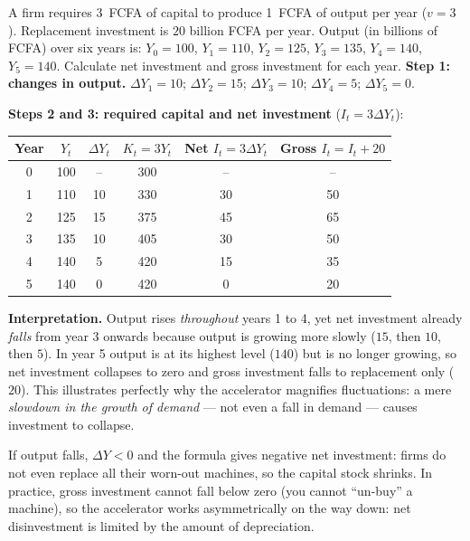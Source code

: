 \documentclass[11pt]{article}
\begin{document}
\begin{exoresolu}
A firm requires \SI{3}{}~FCFA of capital to produce \SI{1}{}~FCFA of output per year ($v=3$). Replacement investment is $20$ billion FCFA per year. Output (in billions of FCFA) over six years is: $Y_0=100$, $Y_1=110$, $Y_2=125$, $Y_3=135$, $Y_4=140$, $Y_5=140$. Calculate net investment and gross investment for each year.
\tcblower
\textbf{Step 1: changes in output.} $\Delta Y_1=10$; $\Delta Y_2=15$; $\Delta Y_3=10$; $\Delta Y_4=5$; $\Delta Y_5=0$.

\textbf{Steps 2 and 3: required capital and net investment} ($I_t=3\Delta Y_t$):

\begin{center}
\begin{tabular}{|c|c|c|c|c|c|}
\hline
\rowcolor{popblueL} Year & $Y_t$ & $\Delta Y_t$ & $K_t=3Y_t$ & Net $I_t=3\Delta Y_t$ & Gross $I_t=I_t+20$ \\
\hline
0 & 100 & -- & 300 & -- & -- \\
\hline
1 & 110 & 10 & 330 & 30 & 50 \\
\hline
2 & 125 & 15 & 375 & 45 & 65 \\
\hline
3 & 135 & 10 & 405 & 30 & 50 \\
\hline
4 & 140 & 5 & 420 & 15 & 35 \\
\hline
5 & 140 & 0 & 420 & 0 & 20 \\
\hline
\end{tabular}
\end{center}

\textbf{Interpretation.} Output rises \emph{throughout} years 1 to 4, yet net investment already \emph{falls} from year 3 onwards because output is growing more slowly ($15$, then $10$, then $5$). In year 5 output is at its highest level ($140$) but is no longer growing, so net investment collapses to zero and gross investment falls to replacement only ($20$). This illustrates perfectly why the accelerator magnifies fluctuations: a mere \emph{slowdown in the growth of demand} --- not even a fall in demand --- causes investment to collapse.
\end{exoresolu}

\begin{attention}
If output falls, $\Delta Y<0$ and the formula gives negative net investment: firms do not even replace all their worn-out machines, so the capital stock shrinks. In practice, gross investment cannot fall below zero (you cannot ``un-buy'' a machine), so the accelerator works asymmetrically on the way down: net disinvestment is limited by the amount of depreciation.
\end{attention}
\end{document}
